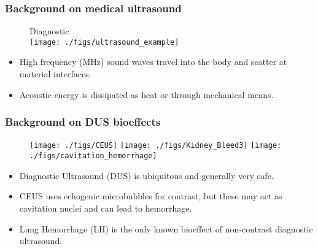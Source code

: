 \begin{frame}%
  \frametitle{\vspace*{0.5cm}Background on medical ultrasound}
  \begin{minipage}{0.45\textwidth}%
    \begin{figure}%
      \centering%
      Diagnostic\\%
      \texttt{[image: ./figs/ultrasound\_example]}%
    \end{figure}%
  \end{minipage}%
  \begin{minipage}{0.45\textwidth}%
  \end{minipage}%

  {\small%
    \begin{itemize}%
    \item High frequency (MHz) sound waves travel into the body and scatter at material interfaces.%
    \item Acoustic energy is dissipated as heat or through mechanical means.%
    \end{itemize}%
    \vspace*{4pt}%
    \begin{center}%
    \end{center}%
  }%
\end{frame}
\begin{frame} \frametitle{\vspace*{0.5cm}Background on DUS bioeffects}
  \begin{figure}
    \centering
    \texttt{[image: ./figs/CEUS]}\hfill
    \texttt{[image: ./figs/Kidney\_Bleed3]}\hfill
    \texttt{[image: ./figs/cavitation\_hemorrhage]}
  \end{figure}
  {\small
    \begin{itemize}
    \item Diagnostic Ultrasound (DUS) is ubiquitous and generally very safe.
    \item CEUS uses echogenic microbubbles for contrast, but these may act as cavitation nuclei and can lead to hemorrhage.
    \item Lung Hemorrhage (LH) is the only known bioeffect of non-contrast diagnostic ultrasound.
    \end{itemize}
  }
\end{frame}
